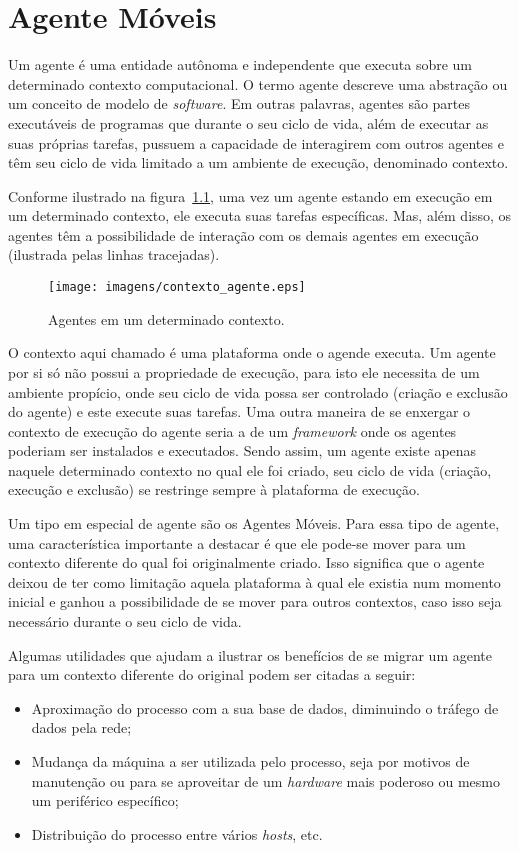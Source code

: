 \chapter{Agente Móveis}

	Um agente é uma entidade autônoma e independente que executa sobre um determinado contexto computacional. O termo agente descreve uma abstração ou um conceito de modelo de \textit{software}. Em outras palavras, agentes são partes executáveis de programas que durante o seu ciclo de vida, além de executar as suas próprias tarefas, pussuem a capacidade de interagirem com outros agentes e têm seu ciclo de vida limitado a um ambiente de execução, denominado contexto.
	
	Conforme ilustrado na figura~\ref{fig:contexto_agente}, uma vez um agente estando em execução em um determinado contexto, ele executa suas tarefas específicas. Mas, além disso, os agentes têm a possibilidade de interação com os demais agentes em execução (ilustrada pelas linhas tracejadas).

\begin{figure}[htb]
  \centering
  \centerline{\texttt{[image: imagens/contexto\_agente.eps]}}
  \caption{Agentes em um determinado contexto.}
\label{fig:contexto_agente}
\end{figure}

	O contexto aqui chamado é uma plataforma onde o agende executa. Um agente por si só não possui a propriedade de execução, para isto ele necessita de um ambiente propício, onde seu ciclo de vida possa ser controlado (criação e exclusão do agente) e este execute suas tarefas. Uma outra maneira de se enxergar o contexto de execução do agente seria a de um \textit{framework} onde os agentes poderiam ser instalados e executados. Sendo assim, um agente existe apenas naquele determinado contexto no qual ele foi criado, seu ciclo de vida (criação, execução e exclusão) se restringe sempre à plataforma de execução.
	
	Um tipo em especial de agente são os Agentes Móveis. Para essa tipo de agente, uma característica importante a destacar é que ele pode-se mover para um contexto diferente do qual foi originalmente criado. Isso significa que o agente deixou de ter como limitação aquela plataforma à qual ele existia num momento inicial e ganhou a possibilidade de se mover para outros contextos, caso isso seja necessário durante o seu ciclo de vida. 
	
	Algumas utilidades que ajudam a ilustrar os benefícios de se migrar um agente para um contexto diferente do original podem ser citadas a seguir:
	\begin{itemize}
		\item Aproximação do processo com a sua base de dados, diminuindo o tráfego de dados pela rede;
		\item Mudança da máquina a ser utilizada pelo processo, seja por motivos de manutenção ou para se aproveitar de um \textit{hardware} mais poderoso ou mesmo um periférico específico;
		\item Distribuição do processo entre vários \textit{hosts}, etc.
	\end{itemize}


